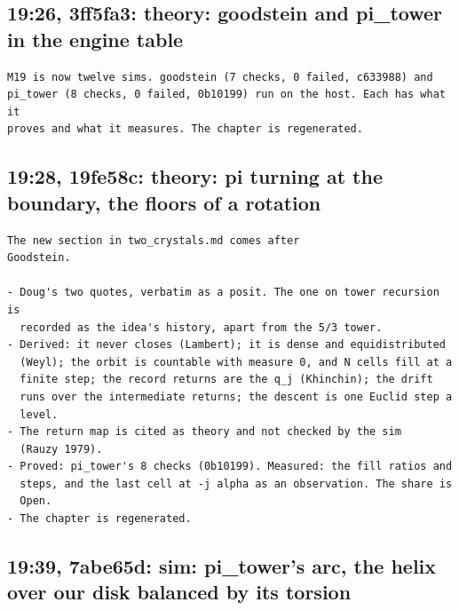 \subsection{\texorpdfstring{19:26, 3ff5fa3: theory: goodstein and pi\_\allowbreak{}tower in the engine table}{19:26, 3ff5fa3: theory: goodstein and pi\_tower in the engine table}}

\begin{Verbatim}
M19 is now twelve sims. goodstein (7 checks, 0 failed, c633988) and
pi_tower (8 checks, 0 failed, 0b10199) run on the host. Each has what it
proves and what it measures. The chapter is regenerated.
\end{Verbatim}

\subsection{\texorpdfstring{19:28, 19fe58c: theory: pi turning at the boundary, the floors of a rotation}{19:28, 19fe58c: theory: pi turning at the boundary, the floors of a rotation}}

\begin{Verbatim}
The new section in two_crystals.md comes after
Goodstein.

- Doug's two quotes, verbatim as a posit. The one on tower recursion is
  recorded as the idea's history, apart from the 5/3 tower.
- Derived: it never closes (Lambert); it is dense and equidistributed
  (Weyl); the orbit is countable with measure 0, and N cells fill at a
  finite step; the record returns are the q_j (Khinchin); the drift
  runs over the intermediate returns; the descent is one Euclid step a
  level.
- The return map is cited as theory and not checked by the sim
  (Rauzy 1979).
- Proved: pi_tower's 8 checks (0b10199). Measured: the fill ratios and
  steps, and the last cell at -j alpha as an observation. The share is
  Open.
- The chapter is regenerated.
\end{Verbatim}

\subsection{\texorpdfstring{19:39, 7abe65d: sim: pi\_\allowbreak{}tower's arc, the helix over our disk balanced by its torsion}{19:39, 7abe65d: sim: pi\_tower's arc, the helix over our disk balanced by its torsion}}

